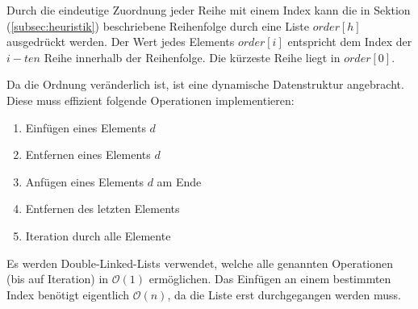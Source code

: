 \documentclass[a4paper, 12pt]{scrartcl}
\begin{document}
Durch die eindeutige Zuordnung jeder Reihe mit einem Index kann die in Sektion (\ref{subsec:heuristik}) beschriebene Reihenfolge durch eine Liste $order[h]$ ausgedrückt werden. Der Wert jedes Elements $order[i]$ entspricht dem Index der $i-ten$ Reihe innerhalb der Reihenfolge. Die kürzeste Reihe liegt in $order[0]$.

Da die Ordnung veränderlich ist, ist eine dynamische Datenstruktur angebracht. Diese muss effizient folgende Operationen implementieren:
\begin{enumerate}
	\itemsep-2pt
	\item Einfügen eines Elements $d$
	\item Entfernen eines Elements $d$
	\item Anfügen eines Elements $d$ am Ende
	\item Entfernen des letzten Elements
	\item Iteration durch alle Elemente
\end{enumerate}
Es werden Double-Linked-Lists verwendet, welche alle genannten Operationen (bis auf Iteration) in $\mathcal{O}(1)$ ermöglichen. Das Einfügen an einem bestimmten Index benötigt eigentlich $\mathcal{O}(n)$, da die Liste erst durchgegangen werden muss.
\end{document}
